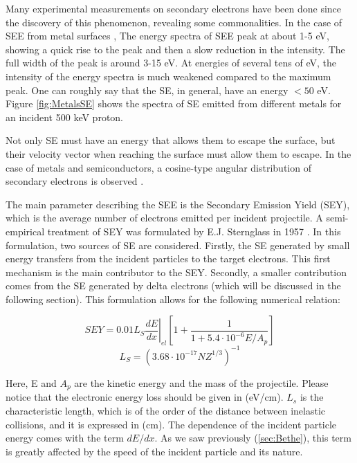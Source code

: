 Many experimental measurements on secondary electrons have been done since the discovery of this phenomenon, revealing some commonalities. In the case of SEE from metal surfaces \parencite*[][]{ref:see3},  The energy spectra of SEE peak at about 1-5 eV, showing a quick rise to the peak and then a slow reduction in the intensity. The full width of the peak is around 3-15 \si[]{\electronvolt}. At energies of several tens of \si[]{\electronvolt}, the intensity of the energy spectra is much weakened compared to the maximum peak. One can roughly say that the SE, in general, have an energy $< 50$ \si[]{\electronvolt}. Figure \ref{fig:MetalsSE} shows the spectra of SE emitted from different metals for an incident 500 \si[]{\kilo\electronvolt} proton. 

Not only SE must have an energy that allows them to escape the surface, but their velocity vector when reaching the surface must allow them to escape. In the case of metals and semiconductors, a cosine-type angular distribution of secondary electrons is observed \parencite[][]{ref:angleSemi}. 

The main parameter describing the SEE is the Secondary Emission Yield (SEY), which is the average number of electrons emitted per incident projectile. A semi-empirical treatment of SEY was formulated by E.J. Sternglass in 1957 \parencite*[][]{ref:SEY}. In this formulation, two sources of SE are considered. Firstly, the SE generated by small energy transfers from the incident particles to the target electrons. This first mechanism is the main contributor to the SEY. Secondly, a smaller contribution comes from the SE generated by delta electrons (which will be discussed in the following section). This formulation allows for the following numerical relation: 

\begin{equation}
    SEY = 0.01 L_S \left. \frac{dE}{dx}\right|_{el} \left[ 1+\frac{1}{1+5.4\cdot 10^{-6} E/A_p}\right]
    \label{eq:sey}
\end{equation}
\begin{equation}
    L_S = \left( 3.68\cdot 10^{-17} N Z^{1/3} \right)^{-1}
    \label{eq:LS}
\end{equation}

Here, E and $A_p$ are the kinetic energy and the mass of the projectile. Please notice that the electronic energy loss should be given in (\si[]{\electronvolt/\centi\metre}). $L_{s}$ is the characteristic length, which is of the order of the distance between inelastic collisions, and it is expressed in (\si[]{\centi\metre}). The dependence of the incident particle energy comes with the term $dE/dx$. As we saw previously (\ref{sec:Bethe}), this term is greatly affected by the speed of the incident particle and its nature. 


